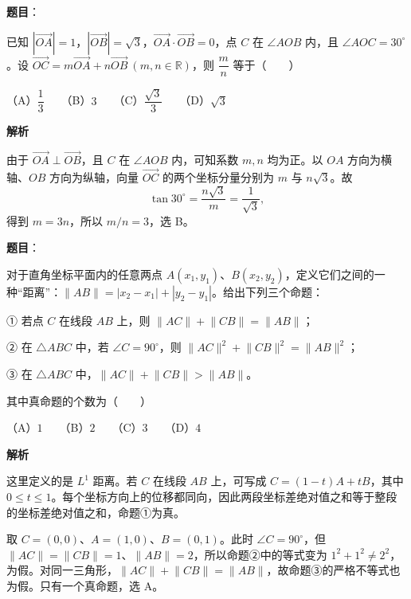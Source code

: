 \begin{answer}

\textbf{题目}：

已知 $|\overrightarrow{OA}|=1$，$|\overrightarrow{OB}|=\sqrt3$，$\overrightarrow{OA}\cdot\overrightarrow{OB}=0$，点 $C$ 在 $\angle AOB$ 内，且 $\angle AOC=30^\circ$。设 $\overrightarrow{OC}=m\overrightarrow{OA}+n\overrightarrow{OB}\ (m,n\in\mathbb R)$，则 $\dfrac mn$ 等于\mbox{（　　）}

（A）$\dfrac13$　　（B）$3$　　（C）$\dfrac{\sqrt3}{3}$　　（D）$\sqrt3$

\textbf{解析}

由于 $\overrightarrow{OA}\perp\overrightarrow{OB}$，且 $C$ 在 $\angle AOB$ 内，可知系数 $m,n$ 均为正。以 $OA$ 方向为横轴、$OB$ 方向为纵轴，向量 $\overrightarrow{OC}$ 的两个坐标分量分别为 $m$ 与 $n\sqrt3$。故
\nopagebreak[4]
\[
\tan30^\circ=\frac{n\sqrt3}{m}=\frac1{\sqrt3},
\]
得到 $m=3n$，所以 $m/n=3$，选 B。


\end{answer}
\begin{answer}

\textbf{题目}：

对于直角坐标平面内的任意两点 $A(x_1,y_1)$、$B(x_2,y_2)$，定义它们之间的一种“距离”：$\lVert AB\rVert=|x_2-x_1|+|y_2-y_1|$。给出下列三个命题：

① 若点 $C$ 在线段 $AB$ 上，则 $\lVert AC\rVert+\lVert CB\rVert=\lVert AB\rVert$；

② 在 $\triangle ABC$ 中，若 $\angle C=90^\circ$，则 $\lVert AC\rVert^2+\lVert CB\rVert^2=\lVert AB\rVert^2$；

③ 在 $\triangle ABC$ 中，$\lVert AC\rVert+\lVert CB\rVert>\lVert AB\rVert$。

其中真命题的个数为\mbox{（　　）}

（A）$1$　　（B）$2$　　（C）$3$　　（D）$4$

\textbf{解析}

这里定义的是 $L^1$ 距离。若 $C$ 在线段 $AB$ 上，可写成 $C=(1-t)A+tB$，其中 $0\le t\le1$。每个坐标方向上的位移都同向，因此两段坐标差绝对值之和等于整段的坐标差绝对值之和，命题①为真。

取 $C=(0,0)$、$A=(1,0)$、$B=(0,1)$。此时 $\angle C=90^\circ$，但 $\lVert AC\rVert=\lVert CB\rVert=1$、$\lVert AB\rVert=2$，所以命题②中的等式变为 $1^2+1^2\ne2^2$，为假。对同一三角形，$\lVert AC\rVert+\lVert CB\rVert=\lVert AB\rVert$，故命题③的严格不等式也为假。只有一个真命题，选 A。


\end{answer}
